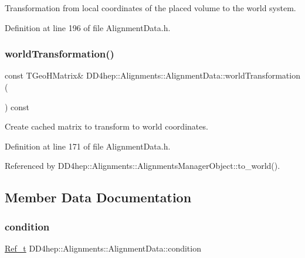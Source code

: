Transformation from local coordinates of the placed volume to the world system. 



Definition at line 196 of file Alignment\+Data.\+h.

\hypertarget{class_d_d4hep_1_1_alignments_1_1_alignment_data_a2968ca6560efa496170adacb25f1c476}{}\label{class_d_d4hep_1_1_alignments_1_1_alignment_data_a2968ca6560efa496170adacb25f1c476} 
\subsubsection{\texorpdfstring{world\+Transformation()}{worldTransformation()}}
{\footnotesize\ttfamily const T\+Geo\+H\+Matrix\& D\+D4hep\+::\+Alignments\+::\+Alignment\+Data\+::world\+Transformation (\begin{DoxyParamCaption}{ }\end{DoxyParamCaption}) const\hspace{0.3cm}{\ttfamily [inline]}}



Create cached matrix to transform to world coordinates. 



Definition at line 171 of file Alignment\+Data.\+h.



Referenced by D\+D4hep\+::\+Alignments\+::\+Alignments\+Manager\+Object\+::to\+\_\+world().



\subsection{Member Data Documentation}
\hypertarget{class_d_d4hep_1_1_alignments_1_1_alignment_data_aab00f6e7c9ac1f261f68440ade585cbb}{}\label{class_d_d4hep_1_1_alignments_1_1_alignment_data_aab00f6e7c9ac1f261f68440ade585cbb} 
\subsubsection{\texorpdfstring{condition}{condition}}
{\footnotesize\ttfamily \hyperlink{group___d_d4_h_e_p___g_e_o_m_e_t_r_y_ga40af83be6718bb8828a3d83dc7f8c930}{Ref\+\_\+t} D\+D4hep\+::\+Alignments\+::\+Alignment\+Data\+::condition}



